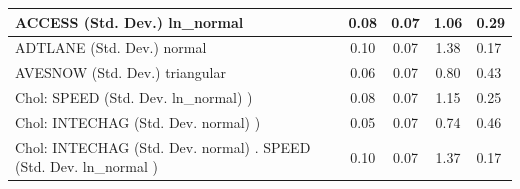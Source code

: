 \begin{table}
\begin{center}
\begin{tabular}{|l|l|c|c|c|l|}
			\hline
			ACCESS (Std. Dev.) ln_normal &  & 0.08 & 0.07 & 1.06 & 0.29 \\
			\hline
			ADTLANE (Std. Dev.) normal &  & 0.10 & 0.07 & 1.38 & 0.17 \\
			\hline
			AVESNOW (Std. Dev.) triangular &  & 0.06 & 0.07 & 0.80 & 0.43 \\
			\hline
			 Chol: SPEED (Std. Dev. ln_normal) ) &  & 0.08 & 0.07 & 1.15 & 0.25 \\
			\hline
			 Chol: INTECHAG (Std. Dev. normal) ) &  & 0.05 & 0.07 & 0.74 & 0.46 \\
			\hline
			 Chol: INTECHAG (Std. Dev. normal) . SPEED (Std. Dev.   ln_normal ) &  & 0.10 & 0.07 & 1.37 & 0.17 \\
			\hline
		\end{tabular}
	\end{center}
\end{table}